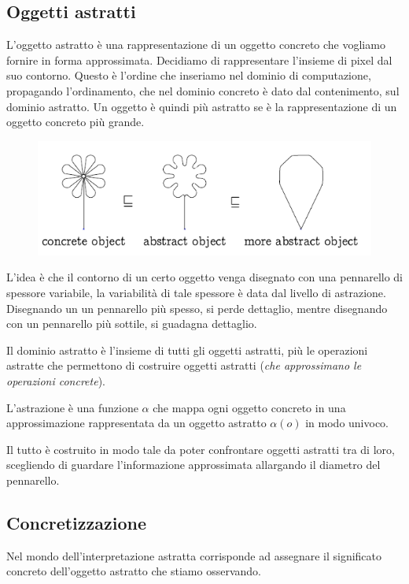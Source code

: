 \subsection{Oggetti astratti}
L'oggetto astratto è una rappresentazione di un oggetto concreto che vogliamo fornire in 
forma approssimata. Decidiamo di rappresentare l'insieme di pixel dal suo contorno.
Questo è l'ordine che inseriamo nel dominio di computazione, propagando l'ordinamento,
che nel dominio concreto è dato dal contenimento, sul dominio astratto.
Un oggetto è quindi più astratto se è la rappresentazione di un oggetto concreto più grande.
\begin{figure}[H]
    \centering
    \includegraphics[scale=0.6]{img/abstractobj.png}
\end{figure}
L'idea è che il contorno di un certo oggetto venga disegnato con una pennarello 
di spessore variabile, la variabilità di tale spessore è data dal livello di astrazione.
Disegnando un un pennarello più spesso, si perde dettaglio, mentre disegnando
con un pennarello più sottile, si guadagna dettaglio.

\begin{tcolorbox}[title = Dominio astratto]
    Il dominio astratto è l'insieme di tutti gli oggetti astratti, più 
    le operazioni astratte che permettono di costruire oggetti astratti
    (\textit{che approssimano le operazioni concrete}).
\end{tcolorbox}
\begin{tcolorbox}[title =  Astrazione]
    L'astrazione è una funzione $\alpha$ che mappa ogni oggetto concreto
    in una approssimazione rappresentata da un oggetto astratto $\alpha(o)$
    in modo univoco.
\end{tcolorbox}
Il tutto è costruito in modo tale da poter confrontare oggetti astratti 
tra di loro, scegliendo di guardare l'informazione approssimata allargando 
il diametro del pennarello.
\subsection{Concretizzazione}
Nel mondo dell'interpretazione astratta corrisponde ad assegnare il significato 
concreto dell'oggetto astratto che stiamo osservando.

